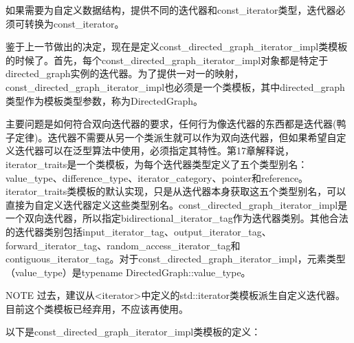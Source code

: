 如果需要为自定义数据结构，提供不同的迭代器和const\_iterator类型，迭代器必须可转换为const\_iterator。


鉴于上一节做出的决定，现在是定义const\_directed\_graph\_iterator\_impl类模板的时候了。首先，每个const\_directed\_graph\_iterator\_impl对象都是特定于directed\_graph实例的迭代器。为了提供一对一的映射，const\_directed\_graph\_iterator\_impl也必须是一个类模板，其中directed\_graph类型作为模板类型参数，称为DirectedGraph。

主要问题是如何符合双向迭代器的要求，任何行为像迭代器的东西都是迭代器(鸭子定律)。迭代器不需要从另一个类派生就可以作为双向迭代器，但如果希望自定义迭代器可以在泛型算法中使用，必须指定其特性。第17章解释说，iterator\_traits是一个类模板，为每个迭代器类型定义了五个类型别名：value\_type、difference\_type、iterator\_category、pointer和reference。iterator\_traits类模板的默认实现，只是从迭代器本身获取这五个类型别名，可以直接为自定义迭代器定义这些类型别名。const\_directed\_graph\_iterator\_impl是一个双向迭代器，所以指定bidirectional\_iterator\_tag作为迭代器类别。其他合法的迭代器类别包括input\_iterator\_tag、output\_iterator\_tag、forward\_iterator\_tag、random\_access\_iterator\_tag和contiguous\_iterator\_tag。对于const\_directed\_graph\_iterator\_impl，元素类型（value\_type）是typename DirectedGraph::value\_type。

\begin{myNotic}{NOTE}
过去，建议从<iterator>中定义的std::iterator类模板派生自定义迭代器。目前这个类模板已经弃用，不应该再使用。
\end{myNotic}

以下是const\_directed\_graph\_iterator\_impl类模板的定义：

